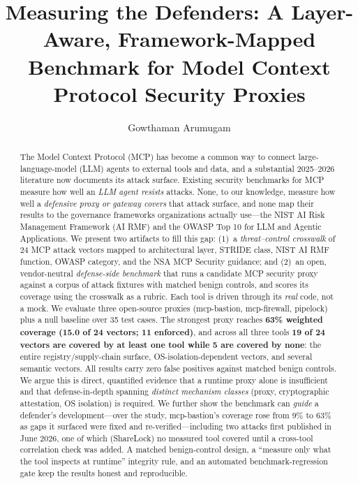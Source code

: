 \documentclass[sigconf,review]{acmart}
\begin{document}
\title{Measuring the Defenders: A Layer-Aware, Framework-Mapped Benchmark for Model Context Protocol Security Proxies}

\author{Gowthaman Arumugam}

\begin{abstract}
The Model Context Protocol (MCP) has become a common way to connect large-language-model (LLM) agents to external tools and data, and a substantial 2025--2026 literature now documents its attack surface. Existing security benchmarks for MCP measure how well an \emph{LLM agent resists} attacks. None, to our knowledge, measure how well a \emph{defensive proxy or gateway covers} that attack surface, and none map their results to the governance frameworks organizations actually use---the NIST AI Risk Management Framework (AI RMF) and the OWASP Top 10 for LLM and Agentic Applications. We present two artifacts to fill this gap: (1)~a \emph{threat--control crosswalk} of 24 MCP attack vectors mapped to architectural layer, STRIDE class, NIST AI RMF function, OWASP category, and the NSA MCP Security guidance; and (2)~an open, vendor-neutral \emph{defense-side benchmark} that runs a candidate MCP security proxy against a corpus of attack fixtures with matched benign controls, and scores its coverage using the crosswalk as a rubric. Each tool is driven through its \emph{real} code, not a mock. We evaluate three open-source proxies (mcp-bastion, mcp-firewall, pipelock) plus a null baseline over 35 test cases. The strongest proxy reaches \textbf{63\% weighted coverage (15.0 of 24 vectors; 11 enforced)}, and across all three tools \textbf{19 of 24 vectors are covered by at least one tool while 5 are covered by none}: the entire registry/supply-chain surface, OS-isolation-dependent vectors, and several semantic vectors. All results carry zero false positives against matched benign controls. We argue this is direct, quantified evidence that a runtime proxy alone is insufficient and that defense-in-depth spanning \emph{distinct mechanism classes} (proxy, cryptographic attestation, OS isolation) is required. We further show the benchmark can \emph{guide} a defender's development---over the study, mcp-bastion's coverage rose from 9\% to 63\% as gaps it surfaced were fixed and re-verified---including two attacks first published in June 2026, one of which (ShareLock) no measured tool covered until a cross-tool correlation check was added. A matched benign-control design, a ``measure only what the tool inspects at runtime'' integrity rule, and an automated benchmark-regression gate keep the results honest and reproducible.
\end{abstract}
\end{document}
